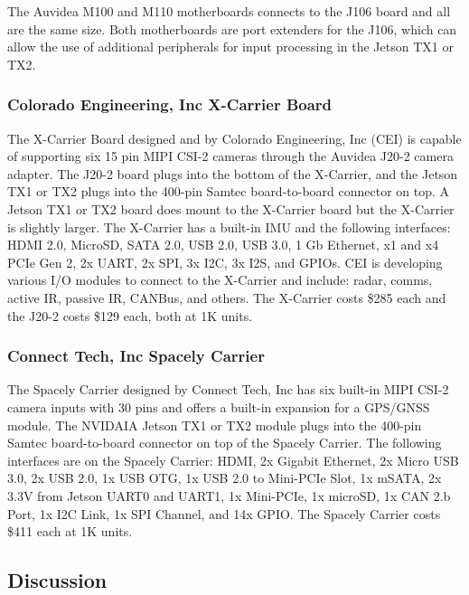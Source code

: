 \documentclass[letterpaper,10pt,serif,draftclsnofoot,onecolumn,compsoc,titlepage]{IEEEtran}
\begin{document}
The Auvidea M100 and M110 motherboards connects to the J106 board and all are the same 
size. Both motherboards are port extenders for the J106, which can allow the use of 
additional peripherals for input processing in the Jetson TX1 or 
TX2\cite{AuvideaMBoards}. \\

\subsubsection{Colorado Engineering, Inc X-Carrier Board}

The X-Carrier Board designed and by Colorado Engineering, Inc (CEI) is capable of 
supporting six 15 pin MIPI CSI-2 cameras through the Auvidea J20-2 camera adapter. The 
J20-2 board plugs into the bottom of the X-Carrier, and the Jetson TX1 or TX2 plugs 
into the 400-pin Samtec board-to-board connector on top. A Jetson TX1 or TX2 board does 
mount to the X-Carrier board but the X-Carrier is slightly larger. The X-Carrier has a built-in IMU 
and the following interfaces: HDMI 2.0, MicroSD, SATA 2.0, USB 2.0, USB 3.0, 1 Gb 
Ethernet, x1 and x4 PCIe Gen 2, 2x UART, 2x SPI, 3x I2C, 3x I2S, and GPIOs. CEI is  
developing various I/O modules to connect to the X-Carrier and include: radar, comms, 
active IR, passive IR, CANBus, and others\cite{CEIXpdf, J20TechRef, AuvideaJ20}. The X-Carrier costs \$285 each 
and the J20-2 costs \$129 each, both at 1K units\cite{SpacelyQuote, AuvideaQuote}. \\
	
\subsubsection{Connect Tech, Inc Spacely Carrier}

The Spacely Carrier designed by Connect Tech, Inc has six built-in MIPI CSI-2 camera 
inputs with 30 pins and offers a built-in expansion for a GPS/GNSS module. The NVIDAIA 
Jetson TX1 or TX2 module plugs into the 400-pin Samtec board-to-board connector on top 
of the Spacely Carrier. The following interfaces are on the Spacely Carrier: HDMI, 2x 
Gigabit Ethernet, 2x Micro USB 3.0, 2x USB 2.0, 1x USB OTG, 1x USB 2.0 to Mini-PCIe 
Slot, 1x mSATA, 2x 3.3V from Jetson UART0 and UART1, 1x Mini-PCIe, 1x microSD, 1x CAN 2.b 
Port, 1x I2C Link, 1x SPI Channel, and 14x GPIO\cite{SpacelyUG}. The Spacely Carrier 
costs \$411 each at 1K units.\\

\subsection{Discussion}
\end{document}
